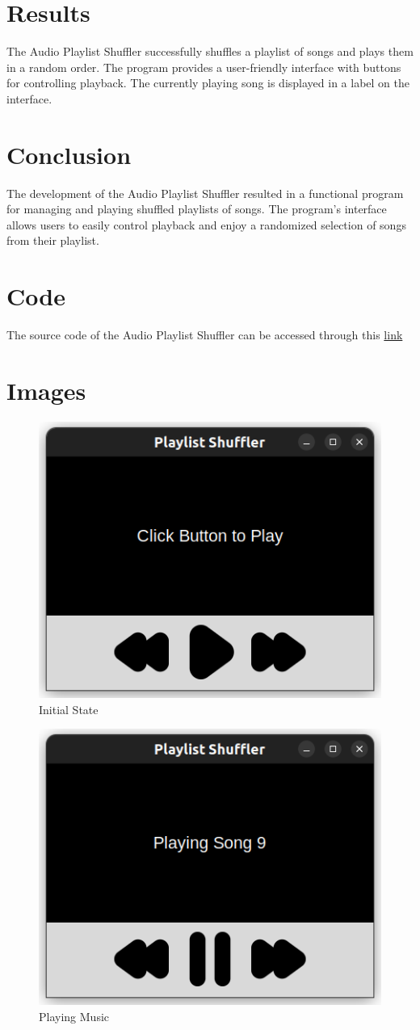 \documentclass{article}
\begin{document}
\section{Results}
The Audio Playlist Shuffler successfully shuffles a playlist of songs and plays them in a random order. The program provides a user-friendly interface with buttons for controlling playback. The currently playing song is displayed in a label on the interface.

\section{Conclusion}
The development of the Audio Playlist Shuffler resulted in a functional program for managing and playing shuffled playlists of songs. The program's interface allows users to easily control playback and enjoy a randomized selection of songs from their playlist.

\section{Code}
The source code of the Audio Playlist Shuffler can be accessed through this \href{https://github.com/GitanshuA/AI-1110/blob/master/Audio%20Playlist%20Shuffler/main.py}{link}

\section{Images}
\begin{figure}[h]
\centering
    \includegraphics[width = 0.5\linewidth]{images/S.png}
    \caption{Initial State}
    \label{fig1}
\end{figure}
\begin{figure}[h]
\centering
    \includegraphics[width = 0.5\linewidth]{images/S1.png}
    \caption{Playing Music}
    \label{fig2}
\end{figure}
\end{document}
